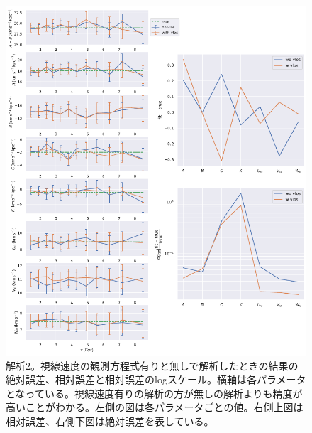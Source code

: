 \begin{figure}[htbp]
	\centering
	\includegraphics[width=15cm]{fig/Mock_vlos.pdf}
	\caption{解析2。視線速度の観測方程式有りと無しで解析したときの結果の絶対誤差、相対誤差と相対誤差のlogスケール。横軸は各パラメータとなっている。視線速度有りの解析の方が無しの解析よりも精度が高いことがわかる。左側の図は各パラメータごとの値。右側上図は相対誤差、右側下図は絶対誤差を表している。} \label{fig:Mock_vlos}
\end{figure}


